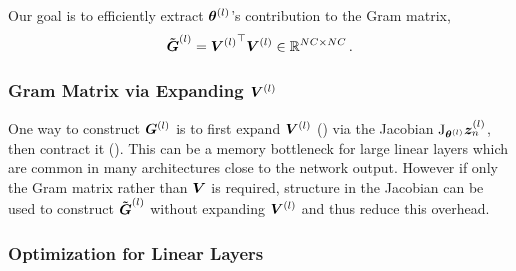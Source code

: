 Our goal is to efficiently extract ${\bm{\theta}}^{(l)}$'s contribution to the Gram matrix,
\begin{align}
  \label{vivit::eq:layerwise-gram-matrix}
  \bm{\tilde{{\bm{G}}}}^{(l)} = {{\bm{V}}^{(l)}}^\top {\bm{V}}^{(l)} \in {\mathbb{R}}^{NC \times NC}\,.
\end{align}

\subsubsection{Gram Matrix via Expanding ${\bm{V}}^{(l)}$}

One way to construct ${\bm{G}}^{(l)}$ is to first expand ${\bm{V}}^{(l)}$
() via the Jacobian $\mathrm{J}_{{\bm{\theta}}^{(l)}}
{\bm{z}}_n^{(l)}$, then contract it (). This can be a
memory bottleneck for large linear layers which are common in many architectures
close to the network output. However if only the Gram matrix rather than ${\bm{V}}$
is required, structure in the Jacobian can be used to construct $\bm{\tilde{{\bm{G}}}}^{(l)}$
without expanding ${\bm{V}}^{(l)}$ and thus reduce this overhead.

\subsubsection{Optimization for Linear Layers}

